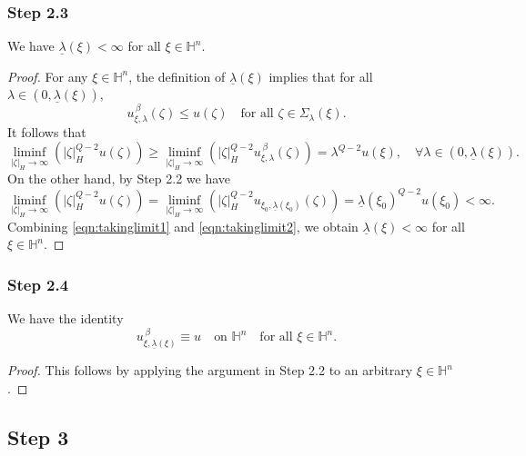 \documentclass[reqno]{amsart}
\theoremstyle{definition}
\theoremstyle{remark}
\numberwithin{equation}{section}
\begin{document}
\subsubsection*{Step 2.3}
We have $\underline{\lambda}(\xi) < \infty$ for all $\xi \in \mathbb{H}^n$.

\begin{proof}
For any $\xi \in \mathbb{H}^n$, the definition of $\underline{\lambda}(\xi)$ implies that for all $\lambda \in (0, \underline{\lambda}(\xi))$,
\[
u_{\xi,\lambda}^{\,\beta}(\zeta) \leq u(\zeta) \quad \text{for all } \zeta \in \Sigma_{\lambda}(\xi).
\]
It follows that
\begin{equation}\label{eqn:takinglimit1}
\liminf_{|\zeta|_{\! H} \to \infty} \left(|\zeta|_{\! H}^{Q-2} u(\zeta)\right) \geq \liminf_{|\zeta|_{\! H} \to \infty} \left(|\zeta|_{\! H}^{Q-2} u_{\xi,\lambda}^{\,\beta}(\zeta)\right) = \lambda^{Q-2} u(\xi), \quad \forall \lambda \in (0, \underline{\lambda}(\xi)).
\end{equation}
On the other hand, by Step 2.2 we have
\begin{equation}\label{eqn:takinglimit2}
\liminf_{|\zeta|_{\! H} \to \infty} \left(|\zeta|_{\! H}^{Q-2} u(\zeta)\right) = \liminf_{|\zeta|_{\! H} \to \infty} \left(|\zeta|_{\! H}^{Q-2} u_{\xi_0,\underline{\lambda}(\xi_0)}(\zeta)\right) = \underline{\lambda}(\xi_0)^{Q-2} u(\xi_0) < \infty.
\end{equation}
Combining \eqref{eqn:takinglimit1} and \eqref{eqn:takinglimit2}, we obtain $\underline{\lambda}(\xi) < \infty$ for all $\xi \in \mathbb{H}^n$.
\end{proof}

\subsubsection*{Step 2.4}
We have the identity
\[
u_{\xi,\underline{\lambda}(\xi)}^{\,\beta} \equiv u \quad \text{on } \mathbb{H}^{n} \quad \text{for all } \xi \in \mathbb{H}^n.
\]

\begin{proof}
This follows by applying the argument in Step 2.2 to an arbitrary $\xi \in \mathbb{H}^n$.
\end{proof}

\subsection*{Step 3}
\end{document}
